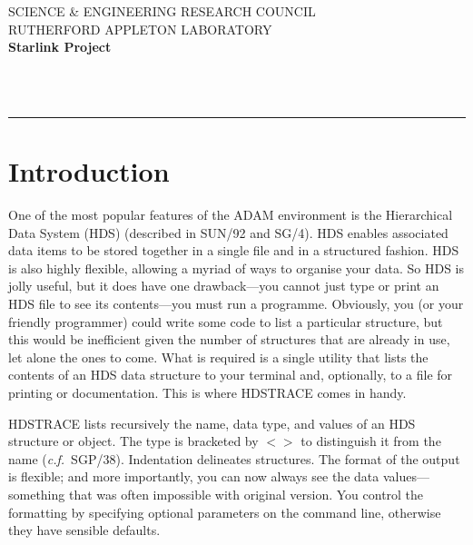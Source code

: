 \newcommand{\sstitem}{\item}



\thispagestyle{empty}
SCIENCE \& ENGINEERING RESEARCH COUNCIL \hfill \stardocname\\
RUTHERFORD APPLETON LABORATORY\\
{\large\bf Starlink Project\\}
{\large\bf \stardoccategory\ \stardocnumber}
\begin{flushright}
\stardocauthors\\
\stardocdate
\end{flushright}
\vspace{-4mm}
\rule{\textwidth}{0.5mm}
\vspace{5mm}
\begin{center}
{\Large\bf \stardoctitle}
\end{center}
\vspace{5mm}

\section{Introduction}
One of the most popular features of the ADAM environment is the
Hierarchical Data System (HDS) (described in SUN/92 and SG/4).   HDS
enables associated data items to be stored together in a single file and
in a structured fashion.  HDS is also highly flexible, allowing a myriad
of ways to organise your data.  So HDS is jolly useful, but it does have
one drawback---you cannot just type or print an HDS file to see its
contents---you must run a programme.  Obviously, you (or your friendly
programmer) could write some code to list a particular structure, but
this would be inefficient given the number of structures that are
already in use, let alone the ones to come.  What is required is a
single utility that lists the contents of an HDS data structure to your
terminal and, optionally, to a file for printing or documentation. This
is where {\footnotesize HDSTRACE} comes in handy. 

{\footnotesize HDSTRACE} lists recursively the name, data type, and
values of an HDS structure or object.  The type is bracketed by $<>$ to
distinguish it from the name ({\it c.f.}\ SGP/38).  Indentation
delineates structures.  The format of the output is flexible; and more
importantly, you can now always see the data values---something that was
often impossible with original version.  You control the formatting by
specifying optional parameters on the command line, otherwise they have
sensible defaults. 

